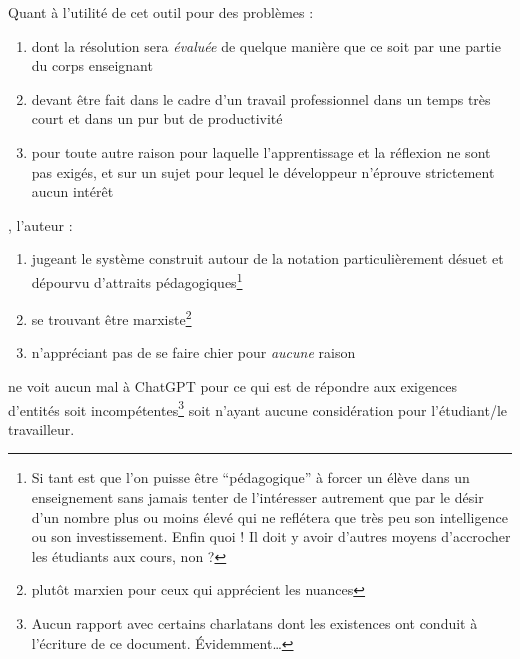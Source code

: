 \documentclass[../../../main.tex]{subfiles}
\begin{document}
Quant à l'utilité de cet outil pour des problèmes :
\begin{enumerate}
\item dont la résolution sera \textit{évaluée} de quelque manière que ce soit par une partie du corps enseignant
\item devant être fait dans le cadre d'un travail professionnel dans un temps très court et dans un pur but de productivité
\item pour toute autre raison pour laquelle l'apprentissage et la réflexion ne sont pas exigés, et sur un sujet pour lequel le développeur n'éprouve strictement aucun intérêt
\end{enumerate}
, l'auteur :
\begin{enumerate}
\item jugeant le système construit autour de la notation particulièrement désuet et dépourvu d'attraits pédagogiques\footnote{Si tant est que l'on puisse être ``pédagogique'' à forcer un élève dans un enseignement sans jamais tenter de l'intéresser autrement que par le désir d'un nombre plus ou moins élevé qui ne reflétera que très peu son intelligence ou son investissement. Enfin quoi ! Il doit y avoir d'autres moyens d'accrocher les étudiants aux cours, non ?}
\item se trouvant être marxiste\footnote{plutôt marxien pour ceux qui apprécient les nuances}
\item n'appréciant pas de se faire chier pour \textit{aucune} raison
\end{enumerate}
ne voit aucun mal à ChatGPT pour ce qui est de répondre aux exigences d'entités soit incompétentes\footnote{Aucun rapport avec certains charlatans dont les existences ont conduit à l'écriture de ce document. Évidemment\dots} soit n'ayant aucune considération pour l'étudiant/le travailleur.
\end{document}
